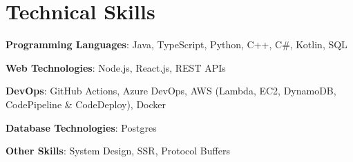 \documentclass[letterpaper,12pt]{extarticle}
\begin{document}
\section{Technical Skills}
\begin{itemize}[leftmargin=0.15in, label={}]
    \itemsep -2pt
	\small{\item{
		\textbf{Programming Languages}{: Java, TypeScript, Python, C++, C\#, Kotlin, SQL} \\
	}}
    \small{\item{
        \textbf{Web Technologies}{: Node.js, React.js, REST APIs} \\
	}}
    \small{\item{
        \textbf{DevOps}{: GitHub Actions, Azure DevOps, AWS (Lambda, EC2, DynamoDB, CodePipeline \& CodeDeploy), Docker} \\
	}}
    \small{\item{
        \textbf{Database Technologies}{: Postgres} \\
	}}
    \small{\item{
        \textbf{Other Skills}{: System Design, SSR, Protocol Buffers} \\
	}}
\end{itemize}

\end{document}
